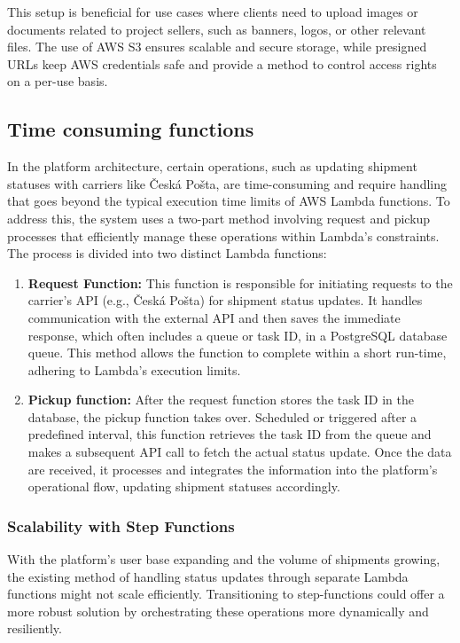 This setup is beneficial for use cases where clients need to upload images or documents related to project sellers, such as banners, logos, or other relevant files. 
The use of AWS S3 ensures scalable and secure storage, while presigned URLs keep AWS credentials safe and provide a method to control access rights on a per-use basis.


\subsection{Time consuming functions}
In the platform architecture, certain operations, such as updating shipment statuses with carriers like Česká Pošta, are time-consuming and require handling that goes beyond the typical execution time limits of AWS Lambda functions. 
To address this, the system uses a two-part method involving request and pickup processes that efficiently manage these operations within Lambda's constraints.
The process is divided into two distinct Lambda functions:
\begin{enumerate}
    \item \textbf{Request Function:} This function is responsible for initiating requests to the carrier's API (e.g., Česká Pošta) for shipment status updates. It handles communication with the external API and then saves the immediate response, which often includes a queue or task ID, in a PostgreSQL database queue. This method allows the function to complete within a short run-time, adhering to Lambda's execution limits.
    \item \textbf{Pickup function:} After the request function stores the task ID in the database, the pickup function takes over. Scheduled or triggered after a predefined interval, this function retrieves the task ID from the queue and makes a subsequent API call to fetch the actual status update. Once the data are received, it processes and integrates the information into the platform's operational flow, updating shipment statuses accordingly.
\end{enumerate}

\subsubsection{Scalability with Step Functions}
With the platform's user base expanding and the volume of shipments growing, the existing method of handling status updates through separate Lambda functions might not scale efficiently. Transitioning to \gls{step-functions} could offer a more robust solution by orchestrating these operations more dynamically and resiliently.





